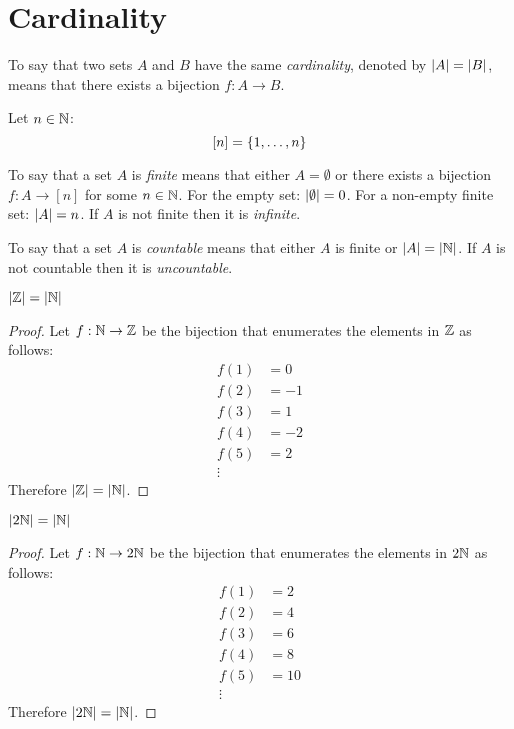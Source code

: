 \documentclass[letterpaper,12pt,fleqn]{article}
\begin{document}
\section*{Cardinality}

\begin{definition}[Cardinality]
  To say that two sets \(A\) and \(B\) have the same \emph{cardinality}, denoted by \(\lvert A\rvert=\lvert B\rvert\), means that
  there exists a bijection \(f:A\to B\).
\end{definition}

\begin{notation}
  Let \(n\in\mathbb{N}\):
  \[[n]=\{1,\ldots,n\}\]
\end{notation}

\begin{definition}[Finite]
  To say that a set \(A\) is \emph{finite} means that either \(A=\emptyset\) or there exists a bijection
  \(f:A\to[n]\) for some \(n\in\mathbb{N}\).  For the empty set: \(\lvert\emptyset\rvert=0\).  For a non-empty finite set:
  \(\lvert A\rvert=n\).  If \(A\) is not finite then it is \emph{infinite}.
\end{definition}

\begin{definition}[Countable]
  To say that a set \(A\) is \emph{countable} means that either \(A\) is finite or \(\lvert A\rvert=\lvert\mathbb{N}\rvert\).  If \(A\)
  is not countable then it is \emph{uncountable}.
\end{definition}

\begin{theorem}
  \(\lvert\mathbb{Z}\rvert=\lvert\mathbb{N}\rvert\)
\end{theorem}

\begin{proof}
  Let \(f:\mathbb{N}\to\mathbb{Z}\) be the bijection that enumerates the elements in \(\mathbb{Z}\) as follows:
  \begin{align*}
    f(1) &= 0 \\
    f(2) &= -1 \\
    f(3) &= 1 \\
    f(4) &= -2 \\
    f(5) &= 2 \\
    \vdots
  \end{align*}
  Therefore \(\lvert\mathbb{Z}\rvert=\lvert\mathbb{N}\rvert\).
\end{proof}

\begin{theorem}
  \(\lvert2\mathbb{N}\rvert=\lvert\mathbb{N}\rvert\)
\end{theorem}

\begin{proof}
  Let \(f:\mathbb{N}\to2\mathbb{N}\) be the bijection that enumerates the elements in \(2\mathbb{N}\) as follows:
  \begin{align*}
    f(1) &= 2 \\
    f(2) &= 4 \\
    f(3) &= 6 \\
    f(4) &= 8 \\
    f(5) &= 10 \\
    \vdots
  \end{align*}
  Therefore \(\lvert2\mathbb{N}\rvert=\lvert\mathbb{N}\rvert\).
\end{proof}
\end{document}
